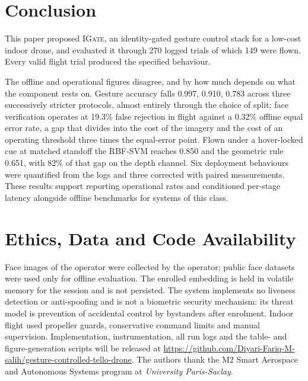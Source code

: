 \documentclass[conference]{IEEEtran}
\newcommand{\method}[1]{\textsc{#1}}
\begin{document}
\section{Conclusion}

This paper proposed \method{IGate}, an identity-gated gesture control stack for
a low-cost indoor drone, and evaluated it through 270 logged trials of which 149
were flown.
Every valid flight trial produced the specified behaviour.

The offline and operational figures disagree, and by how much depends on what
the component rests on.
Gesture accuracy falls 0.997, 0.910, 0.783 across three successively stricter
protocols, almost entirely through the choice of split; face verification
operates at 19.3\% false rejection in flight against a 0.32\% offline equal
error rate, a gap that divides into the cost of the imagery and the cost of an
operating threshold three times the equal-error point.
Flown under a hover-locked cue at matched standoff the RBF-SVM reaches 0.850 and
the geometric rule 0.651, with 82\% of that gap on the depth channel.
Six deployment behaviours were quantified from the logs and three corrected with
paired measurements.
These results support reporting operational rates and conditioned per-stage
latency alongside offline benchmarks for systems of this class.

\section*{Ethics, Data and Code Availability}

Face images of the operator were collected by the operator; public face datasets
were used only for offline evaluation.
The enrolled embedding is held in volatile memory for the session and is not
persisted.
The system implements no liveness detection or anti-spoofing and is not a
biometric security mechanism: its threat model is prevention of accidental
control by bystanders after enrolment.
Indoor flight used propeller guards, conservative command limits and manual
supervision.
Implementation, instrumentation, all run logs and the table- and
figure-generation scripts will be released at
\url{https://github.com/Diyari-Fariq-M-salih/gesture-controlled-tello-drone}.
The authors thank the M2 Smart Aerospace and Autonomous Systems program at
\textit{University Paris-Saclay}.

\balance


\end{document}
